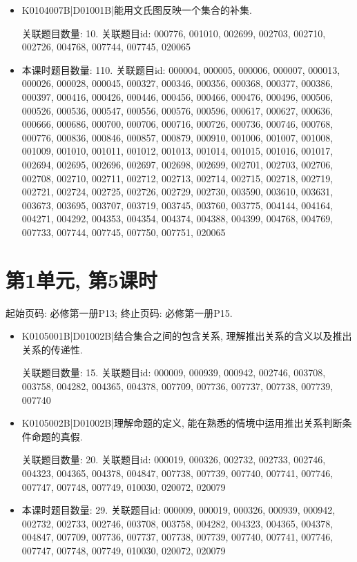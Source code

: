 \begin{itemize}
\item K0104007B|D01001B|能用文氏图反映一个集合的补集.

关联题目数量: 10. 关联题目id: 000776, 001010, 002699, 002703, 002710, 002726, 004768, 007744, 007745, 020065

\item 本课时题目数量: 110. 关联题目id: 000004, 000005, 000006, 000007, 000013, 000026, 000028, 000045, 000327, 000346, 000356, 000368, 000377, 000386, 000397, 000416, 000426, 000446, 000456, 000466, 000476, 000496, 000506, 000526, 000536, 000547, 000556, 000576, 000596, 000617, 000627, 000636, 000666, 000686, 000700, 000706, 000716, 000726, 000736, 000746, 000768, 000776, 000836, 000846, 000857, 000879, 000910, 001006, 001007, 001008, 001009, 001010, 001011, 001012, 001013, 001014, 001015, 001016, 001017, 002694, 002695, 002696, 002697, 002698, 002699, 002701, 002703, 002706, 002708, 002710, 002711, 002712, 002713, 002714, 002715, 002718, 002719, 002721, 002724, 002725, 002726, 002729, 002730, 003590, 003610, 003631, 003673, 003695, 003707, 003719, 003745, 003760, 003775, 004144, 004164, 004271, 004292, 004353, 004354, 004374, 004388, 004399, 004768, 004769, 007733, 007744, 007745, 007750, 007751, 020065

\end{itemize}

\section*{第1单元, 第5课时}
起始页码: 必修第一册P13; 终止页码: 必修第一册P15.
\begin{itemize}
\item K0105001B|D01002B|结合集合之间的包含关系, 理解推出关系的含义以及推出关系的传递性.

关联题目数量: 15. 关联题目id: 000009, 000939, 000942, 002746, 003708, 003758, 004282, 004365, 004378, 007709, 007736, 007737, 007738, 007739, 007740

\item K0105002B|D01002B|理解命题的定义, 能在熟悉的情境中运用推出关系判断条件命题的真假.

关联题目数量: 20. 关联题目id: 000019, 000326, 002732, 002733, 002746, 004323, 004365, 004378, 004847, 007738, 007739, 007740, 007741, 007746, 007747, 007748, 007749, 010030, 020072, 020079

\item 本课时题目数量: 29. 关联题目id: 000009, 000019, 000326, 000939, 000942, 002732, 002733, 002746, 003708, 003758, 004282, 004323, 004365, 004378, 004847, 007709, 007736, 007737, 007738, 007739, 007740, 007741, 007746, 007747, 007748, 007749, 010030, 020072, 020079

\end{itemize}

